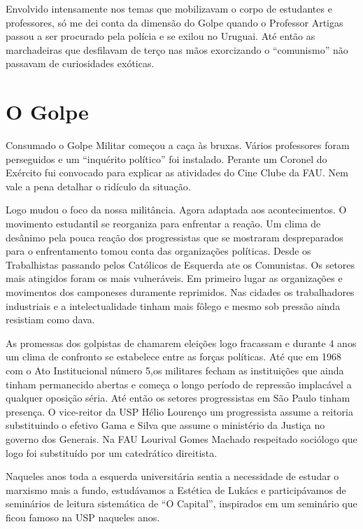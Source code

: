 Envolvido intensamente nos temas que mobilizavam o corpo de estudantes e
professores, só me dei conta da dimensão do Golpe quando o Professor
Artigas passou a ser procurado pela polícia e se exilou no Uruguai. Até
então as marchadeiras que desfilavam de terço nas mãos exorcizando o
“comunismo” não passavam de curiosidades exóticas.

\section{O Golpe}

Consumado o Golpe Militar começou a caça às bruxas. Vários professores
foram perseguidos e um “inquérito político” foi instalado. Perante um
Coronel do Exército fui convocado para explicar as atividades do Cine
Clube da FAU. Nem vale a pena detalhar o ridículo da situação.

Logo mudou o foco da nossa militância. Agora adaptada aos
acontecimentos. O movimento estudantil se reorganiza para enfrentar a
reação. Um clima de desânimo pela pouca reação dos progressistas que se
mostraram despreparados para o enfrentamento tomou conta das
organizações políticas. Desde os Trabalhistas passando pelos Católicos
de Esquerda ate os Comunistas. Os setores mais atingidos foram os mais
vulneráveis. Em primeiro lugar as organizações e movimentos dos
camponeses duramente reprimidos. Nas cidades os trabalhadores
industriais e a intelectualidade tinham mais fôlego e mesmo sob pressão
ainda resistiam como dava.

As promessas dos golpistas de chamarem eleições logo fracassam e durante
4 anos um clima de confronto se estabelece entre as forças políticas.
Até que em 1968 com o Ato Institucional número 5,os militares fecham as
instituições que ainda tinham permanecido abertas e começa o longo
período de repressão implacável a qualquer oposição séria. Até então os
setores progressistas em São Paulo tinham presença. O vice-reitor da USP
Hélio Lourenço um progressista assume a reitoria substituindo o efetivo
Gama e Silva que assume o ministério da Justiça no governo dos Generais.
Na FAU Lourival Gomes Machado respeitado sociólogo que logo foi
substituído por um catedrático direitista.

Naqueles anos toda a esquerda universitária sentia a necessidade de
estudar o marxismo mais a fundo, estudávamos a Estética de Lukács e
participávamos de seminários de leitura sistemática de “O Capital”,
inspirados em um seminário que ficou famoso na USP naqueles anos.

